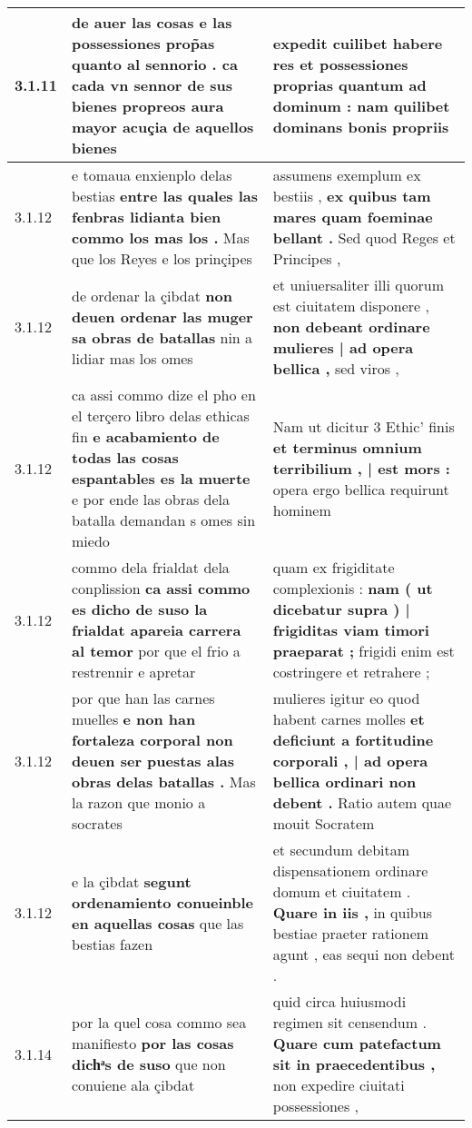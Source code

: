 \begin{tabular}{|p{1cm}|p{6.5cm}|p{6.5cm}|}
3.1.11 & de auer las cosas \textbf{ e las possessiones prop̃as quanto al sennorio . } ca cada vn sennor de sus bienes propreos aura mayor acuçia de aquellos bienes & expedit cuilibet habere res \textbf{ et possessiones proprias quantum ad dominum : } nam quilibet dominans bonis propriis \\\hline
3.1.12 & e tomaua enxienplo delas bestias \textbf{ entre las quales las fenbras lidianta bien commo los mas los . } Mas que los Reyes e los prinçipes & assumens exemplum ex bestiis , \textbf{ ex quibus tam mares quam foeminae bellant . } Sed quod Reges et Principes , \\\hline
3.1.12 & de ordenar la çibdat \textbf{ non deuen ordenar las muger sa obras de batallas } nin a lidiar mas los omes & et uniuersaliter illi quorum est ciuitatem disponere , \textbf{ non debeant ordinare mulieres | ad opera bellica , } sed viros , \\\hline
3.1.12 & ca assi commo dize el pho en el terçero libro delas ethicas fin \textbf{ e acabamiento de todas las cosas espantables es la muerte } e por ende las obras dela batalla demandan s omes sin miedo & Nam ut dicitur 3 Ethic’ finis \textbf{ et terminus omnium terribilium , | est mors : } opera ergo bellica requirunt hominem \\\hline
3.1.12 & commo dela frialdat dela conplission \textbf{ ca assi commo es dicho de suso la frialdat apareia carrera al temor } por que el frio a restrennir e apretar & quam ex frigiditate complexionis : \textbf{ nam ( ut dicebatur supra ) | frigiditas viam timori praeparat ; } frigidi enim est costringere et retrahere ; \\\hline
3.1.12 & por que han las carnes muelles \textbf{ e non han fortaleza corporal non deuen ser puestas alas obras delas batallas . } Mas la razon que monio a socrates & mulieres igitur eo quod habent carnes molles \textbf{ et deficiunt a fortitudine corporali , | ad opera bellica ordinari non debent . } Ratio autem quae mouit Socratem \\\hline
3.1.12 & e la çibdat \textbf{ segunt ordenamiento conueinble en aquellas cosas } que las bestias fazen & et secundum debitam dispensationem ordinare domum et ciuitatem . \textbf{ Quare in iis , } in quibus bestiae praeter rationem agunt , eas sequi non debent . \\\hline
3.1.14 & por la quel cosa commo sea manifiesto \textbf{ por las cosas dichͣs de suso } que non conuiene ala çibdat & quid circa huiusmodi regimen sit censendum . \textbf{ Quare cum patefactum sit in praecedentibus , } non expedire ciuitati possessiones , \\\hline

\end{tabular}
